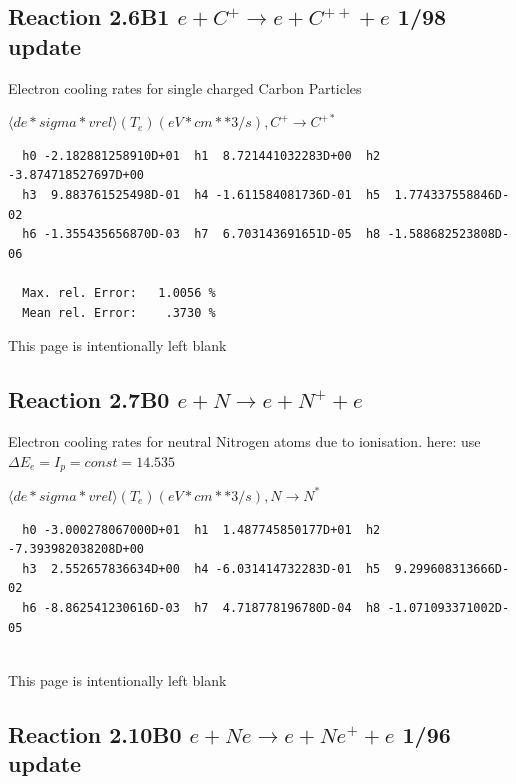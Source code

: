 \documentclass[12pt,dvips]{article}
\begin{document}
\subsection{
Reaction 2.6B1 $e + C^+ \rightarrow e + C^{++} + e  $ 1/98 update
}

 Electron cooling rates for single
 charged Carbon Particles

 $ \langle de*sigma*vrel \rangle(T_e)  (eV*cm**3/s), C^+ \rightarrow C^{+*} $


\begin{small}\begin{verbatim}
  h0 -2.182881258910D+01  h1  8.721441032283D+00  h2 -3.874718527697D+00
  h3  9.883761525498D-01  h4 -1.611584081736D-01  h5  1.774337558846D-02
  h6 -1.355435656870D-03  h7  6.703143691651D-05  h8 -1.588682523808D-06

  Max. rel. Error:   1.0056 %
  Mean rel. Error:    .3730 %

\end{verbatim}\end{small}

\newpage
This page is intentionally left blank
\newpage

\subsection{
Reaction 2.7B0 $e + N \rightarrow e + N^{+} + e  $
}

 Electron cooling rates for neutral Nitrogen atoms due to ionisation.
 here: use $\Delta E_e = I_p = const = 14.535$



 $ \langle de*sigma*vrel \rangle(T_e)  (eV*cm**3/s), N \rightarrow N^{*} $


\begin{small}\begin{verbatim}
  h0 -3.000278067000D+01  h1  1.487745850177D+01  h2 -7.393982038208D+00
  h3  2.552657836634D+00  h4 -6.031414732283D-01  h5  9.299608313666D-02
  h6 -8.862541230616D-03  h7  4.718778196780D-04  h8 -1.071093371002D-05


\end{verbatim}\end{small}

\newpage
This page is intentionally left blank
\newpage


\subsection{
Reaction 2.10B0 $e + Ne \rightarrow e + Ne^+ + e  $ 1/96 update
}
\end{document}
